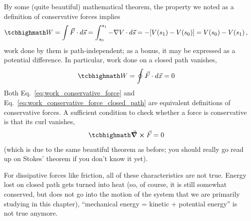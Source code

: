 \documentclass[../class_mech_main.tex]{subfiles}
\begin{document}
By some (quite beautiful) mathematical theorem, the property we noted as a definition of conservative forces implies
\begin{equation}\label{eq:work_conservative_force}
	\eqbox{
		W = \int \vec{F} \cdot d\vec{s} = \int_{s_0}^{s_1} - \nabla V \cdot d\vec{s} = - [V(s_1) - V(s_0)] = V(s_0) - V(s_1)
	} \, ,
\end{equation}
work done by them is path-independent; as a bonus, it may be expressed as a potential difference. In particular, work done on a closed path vanishes,
\begin{equation}\label{eq:work_conservative_force_closed_path}
	\eqbox{
		W = \oint \vec{F} \cdot d\vec{x} = 0
	}
\end{equation}
Both Eq.~\eqref{eq:work_conservative_force} and Eq.~\eqref{eq:work_conservative_force_closed_path} are equivalent definitions of conservative forces. A sufficient condition to check whether a force is conservative is that its curl vanishes,
\begin{equation}\label{eq:conservative_force_condition}
	\eqbox{
		\curl \vec{F} = 0
	}
\end{equation}
(which is due to the same beautiful theorem as before; you should really go read up on Stokes' theorem if you don't know it yet).

For dissipative forces like friction, all of these characteristics are not true. Energy lost on closed path gets turned into heat (so, of course, it is still somewhat conserved, but does not go into the motion of the system that we are primarily studying in this chapter), \enquote{mechanical energy = kinetic + potential energy} is not true anymore.\\




\end{document}

